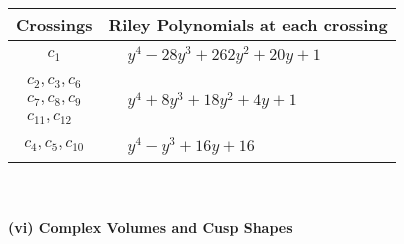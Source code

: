 \documentclass[1p]{elsarticle_modified}
\theoremstyle{definition}
\begin{document}
\begin{tabular}{m{50pt}|m{274pt}}
Crossings & \hspace{64pt}Riley Polynomials at each crossing \\
\hline $$\begin{aligned}c_{1}\end{aligned}$$&$\begin{aligned}
&y^4-28 y^3+262 y^2+20 y+1
\end{aligned}$\\
\hline $$\begin{aligned}c_{2},c_{3},c_{6}\\c_{7},c_{8},c_{9}\\c_{11},c_{12}\end{aligned}$$&$\begin{aligned}
&y^4+8 y^3+18 y^2+4 y+1
\end{aligned}$\\
\hline $$\begin{aligned}c_{4},c_{5},c_{10}\end{aligned}$$&$\begin{aligned}
&y^4- y^3+16 y+16
\end{aligned}$\\
\hline
\end{tabular}\\~\\
\newpage\flushleft \textbf{(vi) Complex Volumes and Cusp Shapes}
\end{document}
